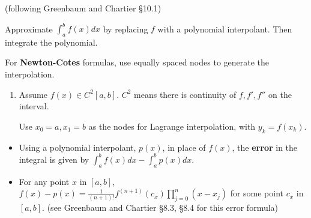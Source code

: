 \documentclass[12pt,letterpaper,noanswers]{exam}
\begin{document}
(following Greenbaum and Chartier \S 10.1)

\begin{tcolorbox}
Approximate $\displaystyle\int_a^b f(x)dx$ by replacing $f$ with a polynomial interpolant.  Then integrate the polynomial.

For \textbf{Newton-Cotes} formulas, use equally spaced nodes to generate the interpolation.
\end{tcolorbox}
\begin{enumerate}[resume=classQ]
\item Assume $f(x) \in C^2[a,b]$.  $C^2$ means there is continuity of $f, f', f''$ on the interval.  

Use $x_0 = a, x_1 = b$ as the nodes for Lagrange interpolation, with $y_k = f(x_k)$.
\end{enumerate}

\begin{tcolorbox}
\begin{itemize}
\itemsep0pt
    \item Using a polynomial interpolant, $p(x)$, in place of $f(x)$, the \textbf{error} in the integral is given by $\displaystyle\int_a^bf(x)dx - \int_a^b p(x)dx.$
    \item For any point $x$ in $[a,b]$, $\displaystyle f(x) - p(x) = \frac{1}{(n+1)!}f^{(n+1)}(c_x)\prod\limits_{j=0}^n(x-x_j)$ for some point $c_x$ in $[a,b]$.
(see Greenbaum and Chartier \S 8.3, \S 8.4 for this error formula)
\end{itemize}
\end{tcolorbox}
\end{document}
